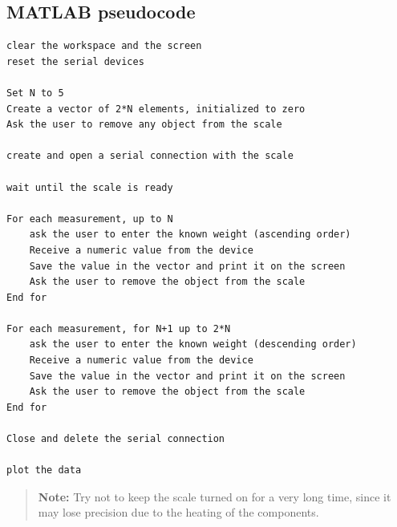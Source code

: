 \subsection{MATLAB pseudocode}

\begin{verbatim}
clear the workspace and the screen
reset the serial devices

Set N to 5
Create a vector of 2*N elements, initialized to zero
Ask the user to remove any object from the scale

create and open a serial connection with the scale

wait until the scale is ready

For each measurement, up to N
    ask the user to enter the known weight (ascending order)
    Receive a numeric value from the device
    Save the value in the vector and print it on the screen
    Ask the user to remove the object from the scale
End for

For each measurement, for N+1 up to 2*N
    ask the user to enter the known weight (descending order)
    Receive a numeric value from the device
    Save the value in the vector and print it on the screen
    Ask the user to remove the object from the scale
End for

Close and delete the serial connection

plot the data
\end{verbatim}

\begin{quote}
\textbf{Note:} Try not to keep the scale turned on for a very long time, since it may lose precision due to the heating of the components.
\end{quote}